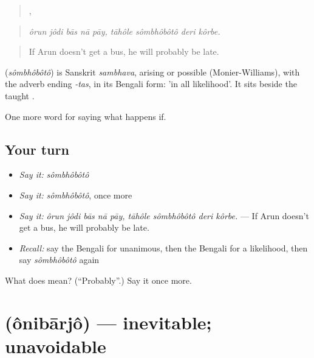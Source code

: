 \begin{quote}
    ,    
\end{quote}

\begin{quote}
\emph{ôrun jôdi bās nā pāy, tāhôle sômbhôbôtô deri kôrbe.}
\end{quote}

\begin{quote}
If Arun doesn't get a bus, he will probably be late.
\end{quote}

\begin{cousinweb}
\textbf{} (\emph{sômbhôbôtô}) is Sanskrit \emph{sambhava}, arising or possible (Monier-Williams), with the adverb ending \emph{-tas}, in its Bengali form: 'in all likelihood'. It sits beside the taught .
\end{cousinweb}

\begin{grammarlens}[title={What you've built}]
One more word for saying what happens if.
\end{grammarlens}

\subsection*{Your turn}
\begin{itemize}
\raggedright
  \item \emph{Say it:} \emph{sômbhôbôtô}
  \item \emph{Say it:} \emph{sômbhôbôtô}, once more
  \item \emph{Say it:} \emph{ôrun jôdi bās nā pāy, tāhôle sômbhôbôtô deri kôrbe.} — If Arun doesn't get a bus, he will probably be late.
  \item \emph{Recall:} say the Bengali for unanimous, then the Bengali for a likelihood, then say \emph{sômbhôbôtô} again
\end{itemize}

\begin{tcolorbox}[breakable,colback=teal!4,colframe=teal!35!black,title={Before you move on}]
What does  mean? (\textquotedblleft{}Probably\textquotedblright{}.) Say it once more.
\end{tcolorbox}
\section[\texorpdfstring{\bn{অনিবার্য} (ônibārjô)}{অনিবার্য (ônibārjô)}]{ (ônibārjô) — inevitable; unavoidable}

